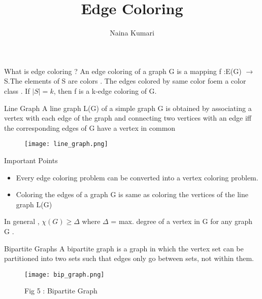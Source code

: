 \documentclass[12pt]{beamer}
\title{Edge Coloring}
\author{Naina Kumari}
\institute{\begin{large}
IIT DELHI
\begin{figure}[h]
\texttt{[image: logo\_d]}
\end{figure}

\end{large}}
\begin{document}
\maketitle

\begin{frame}
\begin{block}{What is edge coloring ? }
An edge coloring of a graph G is a mapping f :E(G) $\rightarrow$ S.The elements of S are colors . The edges colored by same color foem a color class . If $|S| = k $, then f is a k-edge coloring of G.
\end{block}
\end{frame}

\begin{frame}{Line Graph}
A line graph L(G) of a simple graph G is obtained by associating a vertex with each edge of the graph and connecting two vertices with an edge iff the corresponding edges of G have a vertex in common
\begin{figure}
\texttt{[image: line\_graph.png]}
\end{figure}
\end{frame}

\begin{frame}{Important Points}
\begin{itemize}
\item Every edge coloring problem can be converted into a vertex coloring problem.
\item Coloring the edges of a graph G is same as coloring the vertices of the line graph L(G)
\end{itemize}
\end{frame}

\begin{frame}
In general , $\chi(G) \geq \Delta$ where $\Delta$ = max. degree of a vertex in G for any graph G .
\end{frame}

\begin{frame}
\begin{block}{Bipartite Graphs}
A bipartite graph is a graph in which the vertex set can be partitioned into two sets such that edges only go between sets, not within them.
\end{block}
\begin{figure}
\texttt{[image: bip\_graph.png]}
\caption{Fig 5 : Bipartite Graph}
\end{figure}
\end{frame}
\end{document}
